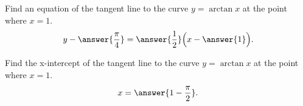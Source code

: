 \documentclass{ximera}
\author{Nela Lakos }
\begin{document}
\begin{exercise}

Find an equation of the tangent line to the curve $y=\arctan{x}$ at the point where $x=1$. 
\[
y-\answer{\frac{\pi}{4}} = \answer{\frac{1}{2}}\Bigl(x-\answer{1}\Bigr).
\]

\end{exercise}
\begin{exercise}

Find the x-intercept of the tangent line to the curve $y=\arctan{x}$ at the point where $x=1$. 
\[
x = \answer{1-\frac{\pi}{2}}.
\]
\end{exercise}
\end{document}
